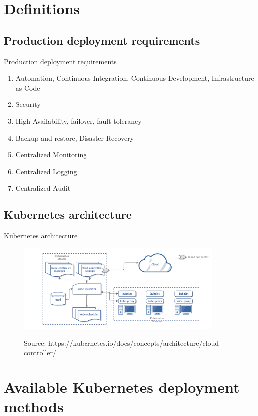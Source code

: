 \documentclass{beamer}
\newcommand{\source}[1]{\caption*{Source: {#1}} }
\begin{document}
\section {Definitions}
\subsection{Production deployment requirements}
\begin{frame}{Production deployment requirements}%
\begin{enumerate}
	\item Automation, Continuous Integration, Continuous Development, Infrastructure as Code
	\item Security
	\item High Availability, failover, fault-tolerancy
	\item Backup and restore, Disaster Recovery
	\item Centralized Monitoring
	\item Centralized Logging
	\item Centralized Audit
\end{enumerate}
\end{frame}

\subsection{Kubernetes architecture}
\begin{frame}{Kubernetes architecture}%
\begin{figure}
	\includegraphics[width=10cm]{figures/k8s-arch.png}
	\label{fig:k8s-arch}
	\source{https://kubernetes.io/docs/concepts/architecture/cloud-controller/}
\end{figure}
\end{frame}

\section{Available Kubernetes deployment methods}
\end{document}
